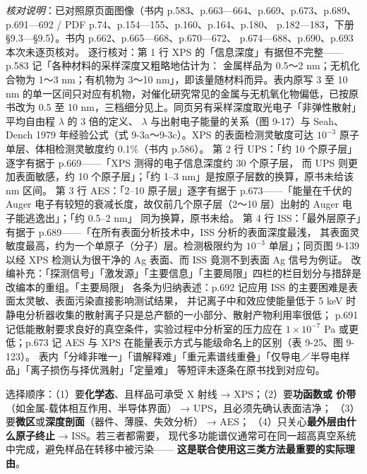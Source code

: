 \emph{核对说明}：已对照原页面图像（书内 p.583、p.663—664、p.669、p.673、p.689、
p.691—692 / PDF p.74、p.154—155、p.160、p.164、p.180、
p.182—183，下册 §9.3—§9.5）。书内 p.662、p.665—668、p.670—672、
p.674—688、p.690、p.693 本次未逐页核对。
逐行核对：第 1 行 XPS 的「信息深度」有据但不完整——p.583 记「各种材料的采样深度又粗略地估计为：
金属样品为 0.5～2 nm；无机化合物为 1～3 nm；有机物为 3～10 nm」，即该量随材料而异。表内原写
3 至 10 nm 的单一区间只对应有机物，对催化研究常见的金属与无机氧化物偏低，已按原书改为 0.5 至 10
nm，三档细分见上。同页另有采样深度取光电子「非弹性散射」平均自由程 $\lambda$ 的 3 倍的定义、
$\lambda$ 与出射电子能量的关系（图 9-17）与 Seah、Dench 1979 年经验公式（式
9-3a～9-3c）。XPS 的表面检测灵敏度可达 $10^{-3}$ 原子单层、体相检测灵敏度约
0.1\%（书内 p.586）。
第 2 行 UPS：「约 10 个原子层」逐字有据于 p.669——「XPS 测得的电子信息深度约 30 个原子层，
而 UPS 则更加表面敏感，约 10 个原子层」；「约 1--3 nm」是按原子层数的换算，原书未给该 nm 区间。
第 3 行 AES：「2--10 原子层」逐字有据于 p.673——「能量在千伏的 Auger
电子有较短的衰减长度，故仅前几个原子层（2～10 层）出射的 Auger 电子能逃逸出」；「约 0.5--2 nm」
同为换算，原书未给。
第 4 行 ISS：「最外层原子」有据于 p.689——「在所有表面分析技术中，ISS 分析的表面深度最浅，
其表面灵敏度最高，约为一个单原子（分子）层。检测极限约为 $10^{-3}$ 单层」；同页图 9-139 以经
XPS 检测认为很干净的 Ag 表面、而 ISS 竟测不到表面 Ag 信号为例证。
改编补充：「探测信号」「激发源」「主要信息」「主要局限」四栏的栏目划分与措辞是改编本的重组。「主要局限」
各条为归纳表述：p.692 记应用 ISS 的主要困难是表面太灵敏、表面污染直接影响测试结果，
并记离子中和效应使能量低于 5 keV 时静电分析器收集的散射离子只是总产额的一小部分、散射产物利用率很低；
p.691 记低能散射要求良好的真空条件，实验过程中分析室的压力应在 $1\times10^{-7}$ Pa
或更低；p.673 记 AES 与 XPS 在能量表示方式与能级命名上的区别（表 9-25、图 9-123）。
表内「分峰非唯一」「谱解释难」「重元素谱线重叠」「仅导电／半导电样品」「离子损伤与择优溅射」「定量难」
等短评未逐条在原书找到对应句。


\begin{dataflow}
选择顺序：（1）要\textbf{化学态}、且样品可承受 X 射线 → XPS；（2）要\textbf{功函数或
价带}（如金属-载体相互作用、半导体界面） → UPS，且必须先确认表面洁净；
（3）要\textbf{微区}或\textbf{深度剖面}（器件、薄膜、失效分析） → AES；
（4）只关心\textbf{最外层由什么原子终止} → ISS。若三者都需要，
现代多功能谱仪通常可在同一超高真空系统中完成，避免样品在转移中被污染——
\textbf{这是联合使用这三类方法最重要的实际理由}。
\end{dataflow}

